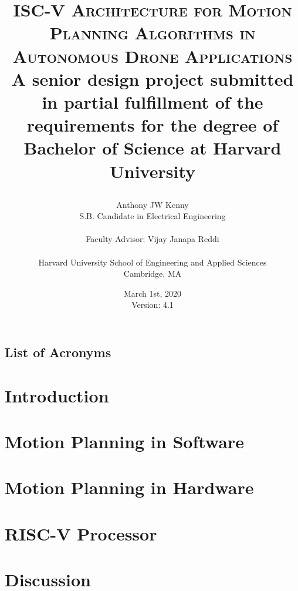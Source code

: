 \documentclass[
    11pt,           %
    letterpaper,    %
    draft,          %
    oneside         %
]{report}           %
\title{\textsc{ISC-V Architecture for Motion Planning Algorithms in Autonomous Drone Applications} \\ 
    \bigskip
    \small{A senior design project submitted in partial fulfillment of the requirements for the degree of Bachelor of Science at Harvard University} \\
\author{Anthony JW Kenny \\
        \small{S.B. Candidate in Electrical Engineering} \\ \\
        Faculty Advisor: Vijay Janapa Reddi \\ \\
        Harvard University School of Engineering and Applied Sciences \\
        \small{Cambridge, MA}}
\date{March 1st, 2020 \\ 
    \small{Version: 4.1}}}
\begin{document}
\maketitle


    
    \clearpage

    \tableofcontents
    \clearpage

    \section*{List of Acronyms}
    

    \listofalgorithms
 
    \listoffigures

    \listoftables



\chapter{Introduction}
    


\chapter{Motion Planning in Software}
    \label{chap:MotionPlanningInSoftware}
    

\chapter{Motion Planning in Hardware}

\chapter{RISC-V Processor}

\chapter{Discussion}
\end{document}
